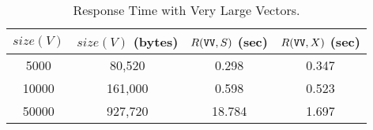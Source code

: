 \documentclass{sig-alternate}
\begin{document}

\begin{table}[t]

  \begin{center}
  \begin{tabular}{| c | c | c | c |}
  \hline
  $size(V)$ & $size(V)$ (bytes) & $R(\mbox{\tt VV}, S)$ (sec) &  
  $R(\mbox{\tt VV}, X)$ (sec) \\  \hline
  5000  & 80,520   & 0.298 & 0.347\\
  10000 & 161,000  & 0.598 & 0.523\\
  50000 & 927,720  & 18.784 & 1.697\\
  \hline
  \end{tabular} 
  \end{center} %

  \vspace*{-.15in}
  \caption{Response Time with Very Large Vectors.}
  \label{tab:increasebig}

\vspace*{-.2in}
\end{table}




\end{document}
